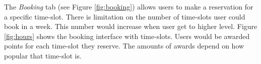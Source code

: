The \emph{Booking} tab (see Figure \ref{fig:booking}) allows users to make a reservation for a specific time-slot. There is limitation on the number of time-slots user could book in a week. This number would increase when user get to higher level. Figure \ref{fig:hours} shows the booking interface with time-slots. Users would be awarded points for each time-slot they reserve. The amounts of awards depend on how popular that time-slot is.
\begin{figure}%
    \centering

\end{figure}
